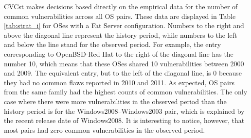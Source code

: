 CVCst makes decisions based directly on the empirical data for the  number of common vulnerabilities across all OS pairs. These data are displayed in Table \ref{tab:strat_i} for OSes with a Fat Server configuration. Numbers to the right and above the diagonal line represent the history period, while numbers to the left and below the line stand for the observed period. For example, the entry corresponding to OpenBSD-Red Hat to the right of the diagonal line has the number 10, which means that these OSes shared 10 vulnerabilities between 2000 and 2009. The equivalent entry, but to the left of the diagonal line, is 0 because they had no common flaws reported in 2010 and 2011. As expected, OS pairs from the same family had the highest counts of common vulnerabilities. The only case where there were more vulnerabilities in the observed period than the history period is for the Windows2008--Windows2003 pair, which is explained by the recent release date of Windows2008. It is interesting to notice, however, that most pairs had zero common vulnerabilities in the observed period.

